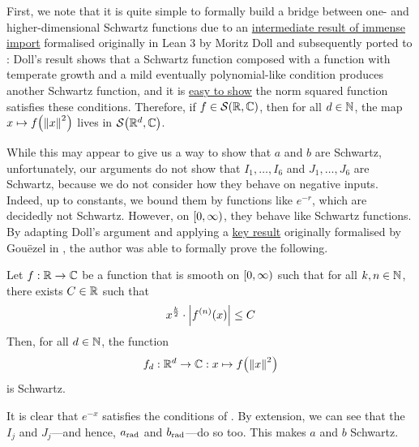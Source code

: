 First, we note that it is quite simple to formally build a bridge between one- and higher-dimensional Schwartz functions due to an \href{https://github.com/leanprover-community/mathlib4/blame/5a2eaa85c555c4263e15928cef249cbaad2eb2d2/Mathlib/Analysis/Distribution/SchwartzSpace.lean#L857}{intermediate result of immense import} formalised originally in Lean 3 by Moritz Doll and subsequently ported to : Doll's result shows that a Schwartz function composed with a function with temperate growth and a mild eventually polynomial-like condition produces another Schwartz function, and it is \href{https://github.com/thefundamentaltheor3m/Sphere-Packing-Lean/blob/704c085b1251cc0c208cc373f4e6105af359edd4/SpherePacking/ForMathlib/RadialSchwartz.lean#L38}{easy to show} the norm squared function satisfies these conditions. Therefore, if $f \in \mathcal{S}\!\left( \mathbb{R}, \mathbb{C} \right)$, then for all $d \in \mathbb{N}$, the map $x \mapsto f\!\left( \left\lVert x \right\rVert^2 \right)$ lives in $\mathcal{S}\!\left( \mathbb{R}^d, \mathbb{C} \right)$.

While this may appear to give us a way to show that $a$ and $b$ are Schwartz, unfortunately, our arguments do not show that $I_1, \ldots, I_6$ and $J_1, \ldots, J_6$ are Schwartz, because we do not consider how they behave on negative inputs. Indeed, up to constants, we bound them by functions like $e^{-r}$, which are decidedly not Schwartz. However, on $\left[0, \infty\right)$, they behave like Schwartz functions. By adapting Doll's argument and applying a \href{https://github.com/leanprover-community/mathlib4/blame/8b8fe2fa631658e55895b284747a997a249d3599/Mathlib/Analysis/Calculus/ContDiff/Bounds.lean#L350}{key result} originally formalised by Gouëzel in , the author was able to formally prove the following.
\begin{boxtheorem}\label{Ch5:Thm:SchwartzLike_to_Schwartz}
    Let $f : \mathbb{R} \to \mathbb{C}$ be a function that is smooth on $\left[0, \infty\right)$ such that for all $k, n \in \mathbb{N}$, there exists $C \in \mathbb{R}$ such that
    \begin{align*}
        x^{\frac{k}{2}} \cdot \left\lvert f^{(n)}\!\left( x \right) \right\rvert \leq C
    \end{align*}
    Then, for all $d \in \mathbb{N}$, the function
    \begin{align*}
        f_d : \mathbb{R}^d \to \mathbb{C} : x \mapsto f\!\left( \left\lVert x \right\rVert^2 \right)
    \end{align*}
    is Schwartz.
\end{boxtheorem}
It is clear that $e^{-x}$ satisfies the conditions of . By extension, we can see that the $I_j$ and $J_j$---and hence, $a_{\operatorname{rad}}$ and $b_{\operatorname{rad}}$---do so too. This makes $a$ and $b$ Schwartz.


